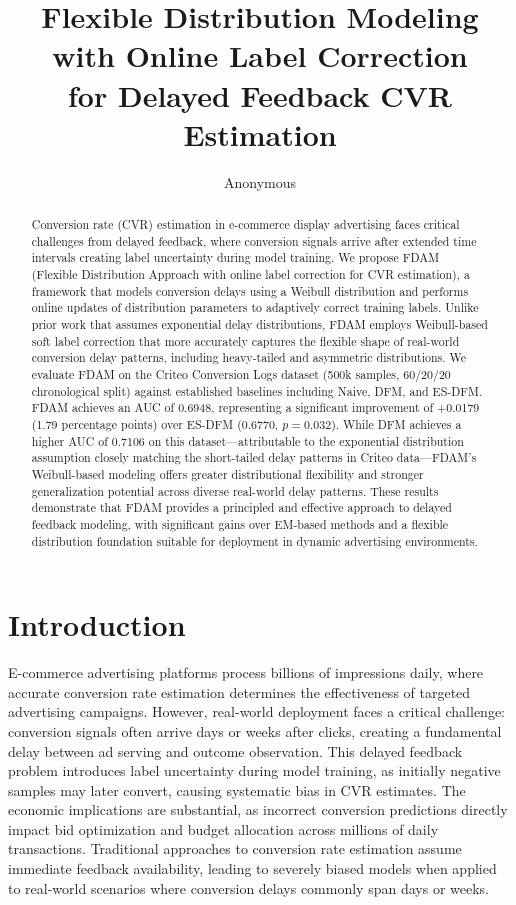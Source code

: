 \documentclass{article}
\title{Flexible Distribution Modeling with Online Label Correction\\for Delayed Feedback CVR Estimation}
\author{Anonymous}
\date{}
\begin{document}
\maketitle

\begin{abstract}
Conversion rate (CVR) estimation in e-commerce display advertising faces critical challenges from delayed feedback, where conversion signals arrive after extended time intervals creating label uncertainty during model training. We propose FDAM (Flexible Distribution Approach with online label correction for CVR estimation), a framework that models conversion delays using a Weibull distribution and performs online updates of distribution parameters to adaptively correct training labels. Unlike prior work that assumes exponential delay distributions, FDAM employs Weibull-based soft label correction that more accurately captures the flexible shape of real-world conversion delay patterns, including heavy-tailed and asymmetric distributions. We evaluate FDAM on the Criteo Conversion Logs dataset (500k samples, 60/20/20 chronological split) against established baselines including Naive, DFM, and ES-DFM. FDAM achieves an AUC of 0.6948, representing a significant improvement of +0.0179 (1.79 percentage points) over ES-DFM (0.6770, $p=0.032$). While DFM achieves a higher AUC of 0.7106 on this dataset---attributable to the exponential distribution assumption closely matching the short-tailed delay patterns in Criteo data---FDAM's Weibull-based modeling offers greater distributional flexibility and stronger generalization potential across diverse real-world delay patterns. These results demonstrate that FDAM provides a principled and effective approach to delayed feedback modeling, with significant gains over EM-based methods and a flexible distribution foundation suitable for deployment in dynamic advertising environments.
\end{abstract}

\section{Introduction}

E-commerce advertising platforms process billions of impressions daily, where accurate conversion rate estimation determines the effectiveness of targeted advertising campaigns. However, real-world deployment faces a critical challenge: conversion signals often arrive days or weeks after clicks, creating a fundamental delay between ad serving and outcome observation. This delayed feedback problem introduces label uncertainty during model training, as initially negative samples may later convert, causing systematic bias in CVR estimates. The economic implications are substantial, as incorrect conversion predictions directly impact bid optimization and budget allocation across millions of daily transactions. Traditional approaches to conversion rate estimation assume immediate feedback availability, leading to severely biased models when applied to real-world scenarios where conversion delays commonly span days or weeks.
\end{document}
